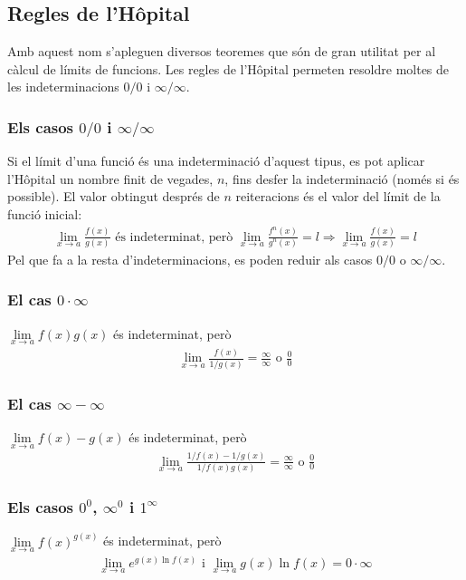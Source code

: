 \subsection{Regles de l'Hôpital}
Amb aquest nom s'apleguen diversos teoremes que són de gran utilitat per al càlcul de límits de funcions. Les regles de l'Hôpital permeten resoldre moltes de les indeterminacions $0/0$ i $\infty / \infty$.

\subsubsection*{Els casos $0/0$ i $\infty / \infty$}
Si el límit d'una funció és una indeterminació d'aquest tipus, es pot aplicar l'Hôpital un nombre finit de vegades, $n$, fins desfer la indeterminació (només si és possible). El valor obtingut després de $n$ reiteracions és el valor del límit de la funció inicial:
\begin{align}
    \lim\limits_{x \to a} \frac{f(x)}{g(x)} \text{ és indeterminat, però }\lim\limits_{x \to a} \frac{f^{n}(x)}{g^{n}(x)}=l \Rightarrow \lim\limits_{x \to a} \frac{f(x)}{g(x)}=l
\end{align}
Pel que fa a la resta d'indeterminacions, es poden reduir als casos $0/0$ o $\infty / \infty$.

\subsubsection*{El cas $0 \cdot \infty$}
$\displaystyle \lim\limits_{x \to a} f(x)g(x)$ és indeterminat, però
\begin{align}
    \lim\limits_{x \to a} \frac{f(x)}{1/g(x)} = \frac{\infty}{\infty} \text{ o } \frac{0}{0} 
\end{align}

\subsubsection*{El cas $\infty - \infty$}
$\displaystyle \lim\limits_{x \to a} f(x) - g(x)$ és indeterminat, però
\begin{align}
    \lim\limits_{x \to a} \frac{1/f(x) - 1/g(x)}{1/f(x)g(x)} = \frac{\infty}{\infty} \text{ o } \frac{0}{0}
\end{align}

\subsubsection*{Els casos $0^{0}$, $\infty^{0}$ i $1^{\infty}$}
$\displaystyle \lim\limits_{x \to a} f(x)^{g(x)}$ és indeterminat, però
\begin{align}
    \lim\limits_{x \to a} e^{g(x) \ln f(x)} \text{ i }\lim\limits_{x \to a} g(x) \ln f(x) = 0 \cdot \infty
\end{align}

